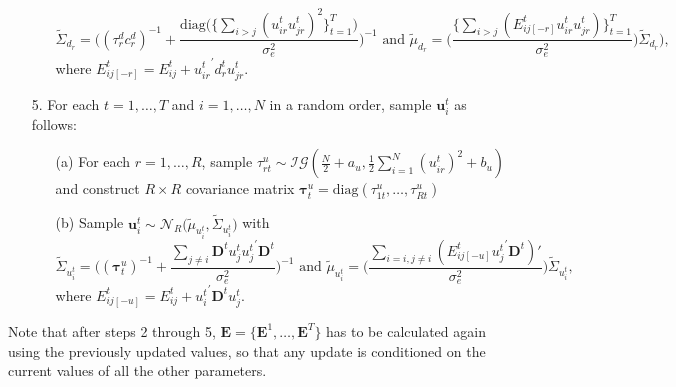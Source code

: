\documentclass[a4paper]{article}
\begin{document}
\begin{itemize}
\begin{enumerate}
			$$\tilde{\Sigma}_{d_r} = \Big((\tau_r^d{c_r^d})^{-1}+\frac{\mbox{diag}\big(\{\sum_{i>j}({u^t_{ir}u^t_{jr}})^2\}_{t=1}^{T}\big)}{\sigma_e^2}\Big)^{-1} \mbox{ and } \tilde{\mu}_{d_r} =  \Big(\frac{\{\sum_{i>j}(E^{t}_{ij[-r]}u^t_{ir}u^t_{jr})\}_{t=1}^{T}}{\sigma_e^2}\Big)\tilde{\Sigma}_{d_r}),$$
			where $E^{t}_{ij[-r]}=E^t_{ij}+{u^t_{ir}}^\prime d^t_{r}u^t_{jr}$.
		\end{enumerate}		
		\item [5.] For each $t =1,\ldots,T$ and $i =1,\ldots,N$ in a random order, sample $\boldsymbol{u}^t_{i}$ as follows:
		\begin{enumerate}
			\item[(a)] For each $r =1,\ldots,R$, sample $\tau_{rt}^{u} \sim \mathcal{IG}(\frac{N}{2}+a_u, \frac{1}{2}\sum\limits_{i=1}^N (u^t_{ir})^2 + b_u)$ and construct $R\times R$ covariance matrix $\boldsymbol{\tau}^u_t = \mbox{diag}(\tau_{1t}^{u},\ldots, \tau_{Rt}^{u})$
					\item [(b)] Sample $\boldsymbol{u}^t_{i}\sim \mathcal{N}_R\big(\tilde{\mu}_{u^t_{i}}, \tilde{\Sigma}_{u^t_{i}} \big)$ with 
			$$\tilde{\Sigma}_{u^t_{i}} = \Big((\boldsymbol{\tau}^u_t)^{-1}+\frac{\sum_{j\neq i}\mathbf{D}^tu^t_{j}{u^t_{j}}^\prime \mathbf{D}^t}{\sigma_e^2}\Big)^{-1}\mbox{ and } \tilde{\mu}_{u^t_{i}} = \Big(\frac{\sum_{i=i, j\neq i}(E^{t}_{ij[-u]}{u^t_{j}}^\prime \mathbf{D}^t)'}{{\sigma_e^2}}\Big)\tilde{\Sigma}_{u^t_{i}},$$ 
			where $E^{t}_{ij[-u]}=E^t_{ij}+{u^t_{i}}^\prime \mathbf{D}^tu^t_{j}.$
		\end{enumerate}			
	\end{itemize}
	Note that after steps 2 through 5, $\mathbf{E} = \{\mathbf{E}^1,\ldots, \mathbf{E}^T\}$ has to be calculated again using the previously updated values, so that any update is conditioned on the current values of all the other parameters. 
\end{document}
